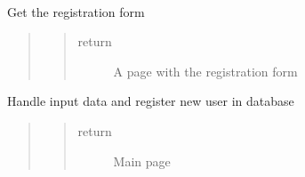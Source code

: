 \documentclass[letterpaper,10pt,english]{sphinxmanual}
\begin{document}
\begin{fulllineitems}
\label{\detokenize{index:views.register.Register}}~

\begin{fulllineitems}
\label{\detokenize{index:views.register.Register.GET}}
Get the registration form
\begin{quote}
\begin{quote}\begin{description}
\item[{return}] \leavevmode
A page with the registration form

\end{description}\end{quote}
\end{quote}

\end{fulllineitems}


\begin{fulllineitems}
\label{\detokenize{index:views.register.Register.POST}}
Handle input data and register new user in database
\begin{quote}
\begin{quote}\begin{description}
\item[{return}] \leavevmode
Main page

\end{description}\end{quote}
\end{quote}

\end{fulllineitems}


\end{fulllineitems}

\label{\detokenize{index:module-views.forms}}
\end{document}

